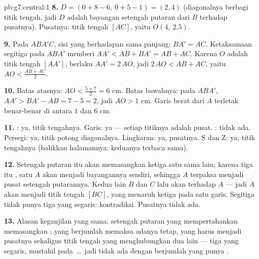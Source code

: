\begin{solution}{pb:g7:central:1}
\textbf{8.} $D = (0 + 8 - 6,\ 0 + 5 - 1) = (2, 4)$ (diagonalnya
berbagi titik tengah, jadi $D$ adalah bayangan setengah putaran dari
$B$ terhadap pusatnya). Pusatnya: titik tengah $[AC]$, yaitu
$O(4,\ 2.5)$.

\textbf{9.} Pada  $ABA'C$, sisi yang berhadapan sama
panjang: $BA' = AC$. Ketaksamaan segitiga pada $ABA'$ memberi
$AA' < AB + BA' = AB + AC$. Karena $O$ adalah titik tengah
$[AA']$, berlaku $AA' = 2\,AO$, jadi $2\,AO < AB + AC$, yaitu
$AO < \frac{AB + AC}{2}$.

\textbf{10.} Batas atasnya: $AO < \frac{5 + 7}{2} = 6$ cm. Batas
bawahnya: pada $ABA'$, $AA' > BA' - AB = 7 - 5 = 2$, jadi
$AO > 1$ cm. Garis berat dari $A$ terletak benar-benar di antara $1$
dan $6$ cm.

\textbf{11.} : ya, titik tengahnya. Garis: ya --- setiap
titiknya adalah pusat. : tidak ada. Persegi:
ya, titik potong diagonalnya. Lingkaran: ya, pusatnya.
S dan Z: ya, titik tengahnya (balikkan halamannya: keduanya terbaca
sama).

\textbf{12.} Setengah putaran itu akan memasangkan ketiga  satu sama lain; karena tiga itu , satu  $A$
akan menjadi bayangannya sendiri, sehingga $A$ terpaksa menjadi pusat
setengah putarannya. Kedua  lain $B$ dan $C$ lalu akan
 terhadap $A$ --- jadi $A$ akan menjadi titik tengah $[BC]$,
yang menaruh ketiga  pada satu garis. Segitiga tidak
punya tiga  yang segaris: kontradiksi. Pusatnya tidak ada.

\textbf{13.} Alasan keganjilan yang sama: setengah putaran yang
mempertahankan  memasangkan ; 
yang berjumlah  memaksa adanya  tetap, yang harus
menjadi pusatnya sekaligus titik tengah  yang menghubungkan
dua  lain --- tiga  yang segaris, mustahil pada
\,\dots\ jadi tidak ada  dengan 
berjumlah  yang punya .


\end{solution}
